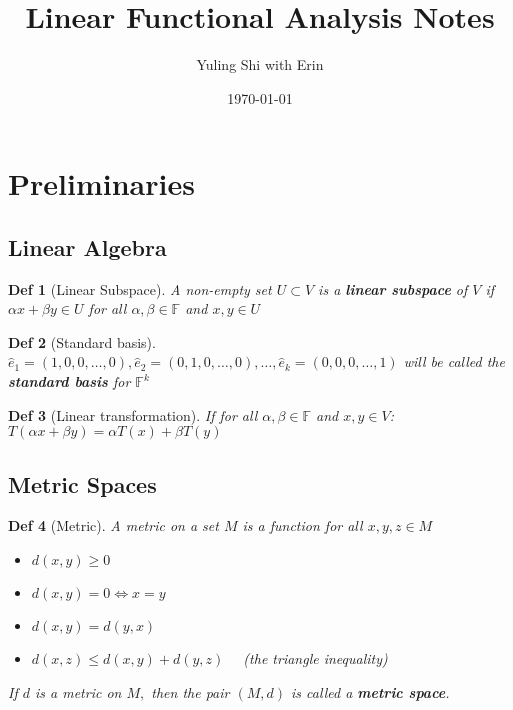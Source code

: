 \documentclass[10pt]{paper}
\title{Linear Functional Analysis Notes}
\date{\today}
\author{{\footnotesize{Yuling Shi}} with Erin}
\newtheorem{definition}{Def}[section]
\begin{document}
\maketitle
\tableofcontents
\footnotesize
\section{Preliminaries}
\subsection{Linear Algebra}

\begin{definition}[Linear Subspace]
    A non-empty set $U \subset V$ is a \textbf{linear subspace} of $V$ if $\alpha x+\beta y \in U $ for all $\alpha, \beta \in \mathbb{F}$ and $x, y \in U$
\end{definition}

\begin{definition}[Standard basis]
    $\widehat{e}_{1}=(1,0,0, \ldots, 0), \widehat{e}_{2}=(0,1,0, \ldots, 0), \ldots, \widehat{e}_{k}=(0,0,0, \ldots, 1)$ will be called the \textbf{standard basis} for $\mathbb{F}^{k}$
\end{definition}

\begin{definition}[Linear transformation]
    If for all $\alpha, \beta \in \mathbb{F}$ and $x, y \in V$: $T(\alpha x+\beta y)=\alpha T(x)+\beta T(y)$
\end{definition}

\subsection{Metric Spaces}

\begin{definition}[Metric]
    A metric on a set $M$ is a function for all $x, y, z \in M$
    \begin{itemize}
        \item $d(x, y) \geq 0$
        \item $d(x, y)=0 \Longleftrightarrow x=y$
        \item $d(x, y)=d(y, x)$
        \item $d(x, z) \leq d(x, y)+d(y, z) \quad$ (the triangle inequality)
    \end{itemize}
    If $d$ is a metric on $M,$ then the pair $(M, d)$ is called a \textbf{metric space}.
\end{definition}
\end{document}
